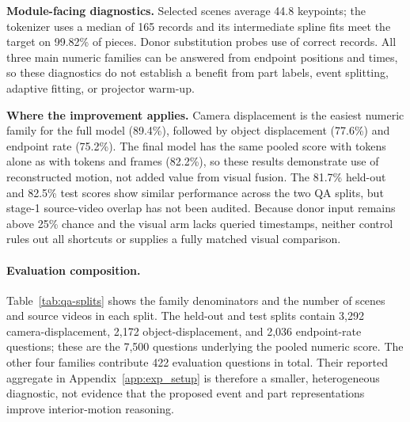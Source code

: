 \textbf{Module-facing diagnostics.}
Selected scenes average 44.8 keypoints; the tokenizer uses a median of 165 records and its intermediate spline fits meet the target on 99.82\% of pieces. Donor substitution probes use of correct records. All three main numeric families can be answered from endpoint positions and times, so these diagnostics do not establish a benefit from part labels, event splitting, adaptive fitting, or projector warm-up.

\textbf{Where the improvement applies.}
Camera displacement is the easiest numeric family for the full model (89.4\%), followed by object displacement (77.6\%) and endpoint rate (75.2\%). The final model has the same pooled score with tokens alone as with tokens and frames (82.2\%), so these results demonstrate use of reconstructed motion, not added value from visual fusion. The 81.7\% held-out and 82.5\% test scores show similar performance across the two QA splits, but stage-1 source-video overlap has not been audited. Because donor input remains above 25\% chance and the visual arm lacks queried timestamps, neither control rules out all shortcuts or supplies a fully matched visual comparison.

\paragraph{Evaluation composition.}
Table~\ref{tab:qa-splits} shows the family denominators and the number of scenes and source videos in each split. The held-out and test splits contain 3,292 camera-displacement, 2,172 object-displacement, and 2,036 endpoint-rate questions; these are the 7,500 questions underlying the pooled numeric score. The other four families contribute 422 evaluation questions in total. Their reported aggregate in Appendix~\ref{app:exp_setup} is therefore a smaller, heterogeneous diagnostic, not evidence that the proposed event and part representations improve interior-motion reasoning.

